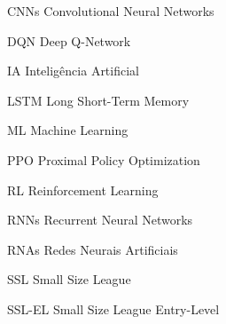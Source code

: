 \begin{siglas}
  \item[CNNs] Convolutional Neural Networks
  \item[DQN] Deep Q-Network
  \item[IA] Inteligência Artificial
  \item[LSTM] Long Short-Term Memory
  \item[ML] Machine Learning
  \item[PPO] Proximal Policy Optimization
  \item[RL] Reinforcement Learning
  \item[RNNs] Recurrent Neural Networks
  \item[RNAs] Redes Neurais Artificiais
  \item[SSL] Small Size League
  \item[SSL-EL] Small Size League Entry-Level
\end{siglas}

